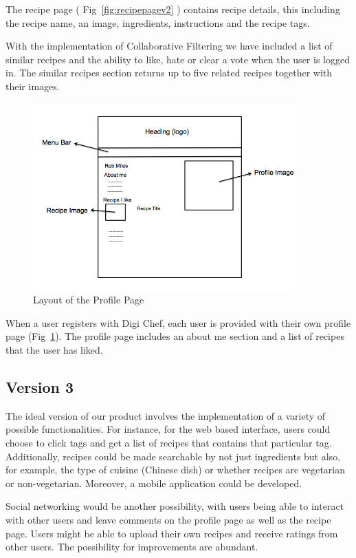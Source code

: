 The recipe page ( Fig~\ref{fig:recipepagev2} ) contains recipe details, this including the recipe name, an image, ingredients, instructions and the recipe tags. 

With the implementation of Collaborative Filtering we have included a list of similar recipes and the ability to like, hate or clear a vote when the user is logged in. The similar recipes section returns up to five related recipes together with their images. 

 
 \begin{figure}[H]
 \begin{center}
\includegraphics[width=0.9\textwidth]{profile_page_v2}
\caption{Layout of the Profile Page}
\label{fig:profilepagev2}
\end{center}
\end{figure}

When a user registers with Digi Chef, each user is provided with their own profile page (Fig~\ref{fig:profilepagev2}). The profile page includes an about me section and a list of recipes that the user has liked. 

\subsection{Version 3}



The ideal version of our product involves the implementation of a variety of possible functionalities. For instance, for the web based interface, users could choose to click tags and get a list of recipes that contains that particular tag. Additionally, recipes could be made searchable by not just ingredients but also, for example, the type of cuisine (Chinese dish) or whether recipes are vegetarian or non-vegetarian. Moreover, a mobile application could be developed. 

Social networking would be another possibility, with users being able to interact with other users and leave comments on the profile page as well as the recipe page. Users might be able to upload their own recipes and receive ratings from other users. The possibility for improvements are abundant.


